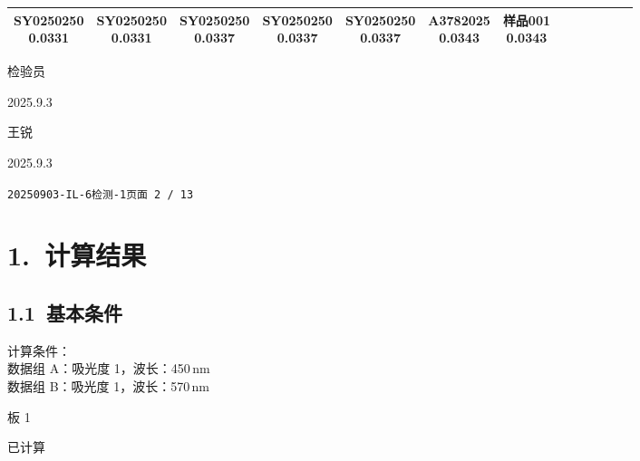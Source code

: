 \documentclass[UTF8,10pt,a4paper,fontset=fandol]{ctexart}
\newcommand{\handwritten}[1]{#1}
\begin{document}
\begin{center}
\begin{tabular}{|c|c|c|c|c|c|c|c|c|c|c|c|c|}
\shortstack{SY0250250\\0.0331} & \shortstack{SY0250250\\0.0331} &
\shortstack{SY0250250\\0.0337} & \shortstack{SY0250250\\0.0337} &
\shortstack{SY0250250\\0.0337} & \shortstack{A3782025\\0.0343} &
\shortstack{样品001\\0.0343} & \\
\hline
\end{tabular}
\end{center}

\handwritten{检验员}

\hspace{1em} 
\handwritten{2025.9.3}

\medskip

\handwritten{王锐}

\hspace{1em}
\handwritten{2025.9.3}

\newpage

\noindent\texttt{20250903-IL-6检测-1}\hfill\texttt{页面 2 / 13}

\section*{1.\ 计算结果}

\subsection*{1.1\ 基本条件}

\noindent 计算条件：\\
\noindent 数据组 A：吸光度 1，波长：450\,nm\\
\noindent 数据组 B：吸光度 1，波长：570\,nm

\medskip

\noindent 板 1

\noindent 已计算

\medskip
\end{document}
